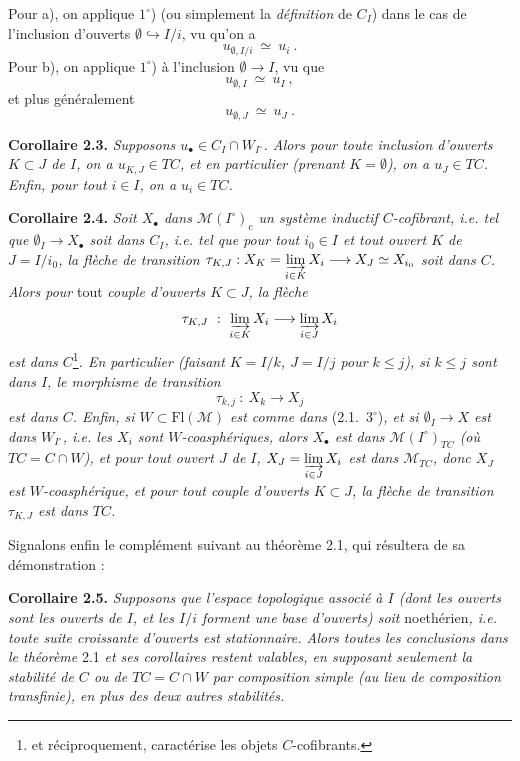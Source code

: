 \documentclass[11pt]{article}
\newcommand{\printedpage}[1]{\marginpar{\footnotesize p.~#1}}
\newcommand{\msp}[1]{\marginpar{\footnotesize [#1]}}
\newcommand{\Fl}{\mathrm{Fl}}
\newcommand{\M}{\mathcal{M}}
\begin{document}
\printedpage{16}

\msp{page 28}

Pour a), on applique $1^\circ$) (ou simplement la \textit{définition} de $C_I$) dans le cas de l'inclusion d'ouverts $\emptyset \hookrightarrow I/i$, vu qu'on a
\[
u_{\emptyset,I/i} \ \simeq\ u_i \ .
\]
Pour b), on applique $1^\circ$) à l'inclusion $\emptyset \longrightarrow I$, vu que
\[
u_{\emptyset,I} \ \simeq\ u_I \ ,
\]
et plus généralement
\[
u_{\emptyset,J} \ \simeq\ u_J \ .
\]

\textbf{Corollaire 2.3.} \textit{Supposons $u_\bullet \in C_I \cap W_{I^\circ}$. Alors pour toute inclusion d'ouverts $K \subset J$ de $I$, on a $u_{K,J} \in TC$, et en particulier (prenant $K = \emptyset$), on a $u_J \in TC$. Enfin, pour tout $i \in I$, on a $u_i \in TC$.}

\textbf{Corollaire 2.4.} \textit{Soit $X_\bullet$ dans $\M(I^\circ)_{\mathrm{c}}$ un système inductif $C$-cofibrant, i.e. tel que $\emptyset_I \longrightarrow X_\bullet$ soit dans $C_I$, i.e. tel que pour tout $i_0 \in I$ et tout ouvert $K$ de $J = I/i_0$, la flèche de transition $\tau_{K,J} : X_K = \varinjlim\limits_{i\in K} X_i \longrightarrow X_J \simeq X_{i_0}$ soit dans $C$. Alors pour} \textup{tout} \textit{couple d'ouverts $K \subset J$, la flèche}
\[
\tau_{K,J} \ :\ \varinjlim_{i\in K} X_i \longrightarrow \varinjlim_{i\in J} X_i
\]
\textit{est dans $C$}\footnote[12]{et réciproquement, caractérise les objets $C$-cofibrants.}\textit{. En particulier (faisant $K = I/k$, $J = I/j$ pour $k \leq j$), si $k \leq j$ sont dans $I$, le morphisme de transition}
\[
\tau_{k,j} \ :\ X_k \longrightarrow X_j
\]
\msp{page 29}
\textit{est dans $C$. Enfin, si $W \subset \Fl(\M)$ est comme dans} \textup{(2.1.\ $3^\circ$)}\textit{, et si $\emptyset_I \longrightarrow X$ est dans $W_{I^\circ}$, i.e. les $X_i$ sont $W$-coasphériques, alors $X_\bullet$ est dans $\M(I^\circ)_{TC}$ (où $TC = C \cap W$), et pour tout ouvert $J$ de $I$, $X_J = \varinjlim\limits_{i\in J} X_i$ est dans $\M_{TC}$, donc $X_J$ est $W$-coasphérique, et pour tout couple d'ouverts $K \subset J$, la flèche de transition $\tau_{K,J}$ est dans $TC$.}

Signalons enfin le complément suivant au théorème 2.1, qui résultera de sa démonstration :

\textbf{Corollaire 2.5.} \textit{Supposons que l'espace topologique associé à $I$ (dont les ouverts sont les ouverts de $I$, et les $I/i$ forment une base d'ouverts) soit} \textup{noethérien}\textit{, i.e. toute suite croissante d'ouverts est stationnaire. Alors toutes les conclusions dans le théorème} \textup{2.1} \textit{et ses corollaires restent valables, en supposant seulement la stabilité de $C$ ou de $TC = C \cap W$ par composition simple (au lieu de composition transfinie), en plus des deux autres stabilités.}
\end{document}
